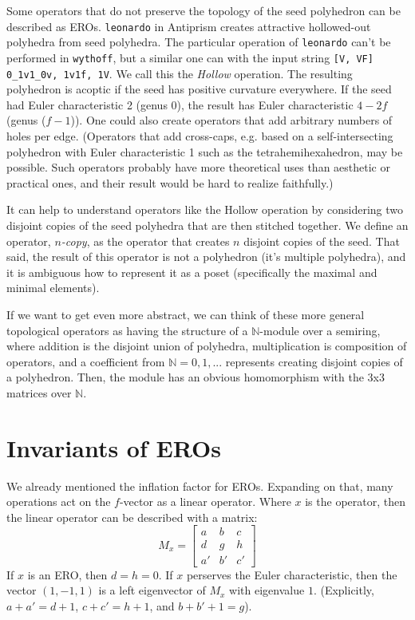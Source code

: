 \documentclass[12pt]{amsart}%
\begin{document}
Some operators that do not preserve the topology of the seed polyhedron can be
described as EROs. \texttt{leonardo} in Antiprism creates attractive
hollowed-out polyhedra from seed polyhedra. The particular operation of
\texttt{leonardo} can't be performed in \texttt{wythoff}, but a similar one can
with the input string \texttt{[V, VF] 0\_1v1\_0v, 1v1f, 1V}. We call this the
\textit{Hollow} operation. The resulting polyhedron is acoptic if the seed has
positive curvature everywhere. If the seed had Euler characteristic 2 (genus
0), the result has Euler characteristic $4-2f$ (genus ($f-1$)). One could also
create operators that add arbitrary numbers of holes per edge. (Operators that
add cross-caps, e.g. based on a self-intersecting polyhedron with Euler
characteristic 1 such as the tetrahemihexahedron, may be possible. Such
operators probably have more theoretical uses than aesthetic or practical
ones, and their result would be hard to realize faithfully.)

It can help to understand operators like the Hollow operation by considering
two disjoint copies of the seed polyhedra that are then stitched together. We
define an operator, \textit{$n$-copy}, as the operator that creates $n$
disjoint copies of the seed. That said, the result of this operator is not a
polyhedron (it's multiple polyhedra), and it is ambiguous how to represent it
as a poset (specifically the maximal and minimal elements).

If we want to get even more abstract, we can think of these more general
topological operators as having the structure of a $\mathbb{N}$-module over a
semiring, where addition is the disjoint union of polyhedra, multiplication is
composition of operators, and a coefficient from $\mathbb{N} = {0, 1, ...}$
represents creating disjoint copies of a polyhedron. Then, the module has an
obvious homomorphism with the 3x3 matrices over $\mathbb{N}$.

\section{Invariants of EROs}
We already mentioned the inflation factor for EROs. \cite{brinkmann}
Expanding on that, many operations act on the $f$-vector as a linear operator.
Where $x$ is the operator, then the linear operator can be described with a
matrix:
\begin{equation}
  M_x = \begin{bmatrix}
  a & b & c \\
  d & g & h \\
  a' & b' & c' \end{bmatrix}
\end{equation}
If $x$ is an ERO, then $d = h= 0$. If $x$ perserves the Euler characteristic,
then the vector $(1,-1,1)$ is a left eigenvector of $M_x$ with eigenvalue $1$.
(Explicitly, $a + a' = d + 1$, $c+ c' = h+1$, and $b + b' + 1 = g$).
\end{document}
